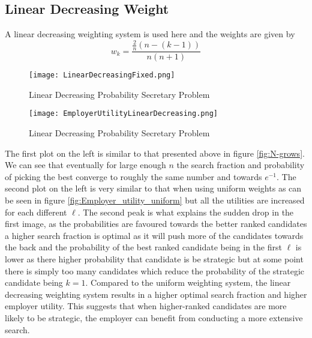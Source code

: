\documentclass{article}
\begin{document}
\subsection{Linear Decreasing Weight}

A linear decreasing weighting system is used here and the weights are given by 
$$ w_k = \frac{\frac{2}{n}(n-(k-1))}{n(n+1)} $$


\begin{table}[H]
\centering
\begin{minipage}{0.5\textwidth}
\small
\begin{figure}[H]
\centering
\centering
\texttt{[image: LinearDecreasingFixed.png]}
\caption{Linear Decreasing Probability Secretary Problem}
\label{fig:linear_decreasing}
\end{figure}
\end{minipage}\hfill
\centering
\begin{minipage}{0.49\textwidth}
\small
\begin{figure}[H]
\centering
\centering
\texttt{[image: EmployerUtilityLinearDecreasing.png]}
\caption{Linear Decreasing Probability Secretary Problem}
\label{fig:linear_decreasing_employer_utility}
\end{figure}
\end{minipage}\hfill
\end{table}

The first plot on the left is similar to that presented above in figure \ref{fig:N-grows}. We can see that eventually for large enough $n$ the search fraction and probability of picking the best converge to roughly the same number and towards $e^{-1}$. The second plot on the left is very similar to that when using uniform weights as can be seen in figure \ref{fig:Employer_utility_uniform} but all the utilities are increased for each different $\ell$. The second peak is what explains the sudden drop in the first image, as the probabilities are favoured towards the better ranked candidates a higher search fraction is optimal as it will push more of the candidates towards the back and the probability of the best ranked candidate being in the first $\ell$ is lower as there higher probability that candidate is be strategic but at some point there is simply too many candidates which reduce the probability of the strategic candidate being $k=1$. Compared to the uniform weighting system, the linear decreasing weighting system results in a higher optimal search fraction and higher employer utility. This suggests that when higher-ranked candidates are more likely to be strategic, the employer can benefit from conducting a more extensive search.
\end{document}
